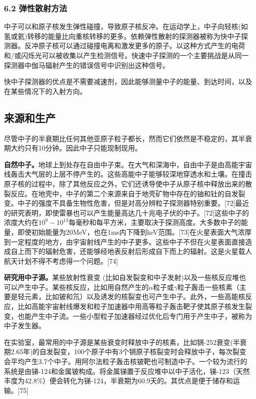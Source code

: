 \subsubsection{6.2 弹性散射方法}
中子可以和原子核发生弹性碰撞，导致原子核反冲。在运动学上，中子向轻核(如氢或氦)转移的能量比向重核转移的更多。依赖弹性散射的探测器被称为快中子探测器。反冲原子核可以通过碰撞电离和激发更多的原子。以这种方式产生的电荷和/或闪烁光可以被收集以产生检测信号。快速中子探测的一个主要挑战是从同一探测器中伽马辐射产生的错误信号中识别出这种信号。

快中子探测器的优点是不需要减速剂，因此能够测量中子的能量、到达时间，以及在某些情况下的入射方向。

\subsection{来源和生产}
尽管中子的半衰期比任何其他亚原子粒子都长，然而它们依然是不稳定的，其半衰期大约只有10分钟。因此中子只能现制现用。

\textbf{自然中子。}地球上到处存在自由中子束。在大气和深海中，自由中子是由高能宇宙线轰击大气层的上层不停产生的。这些高能中子能够较深地穿透水和土壤。在撞击原子核的过程中，除了其他反应之外，它们还诱导使中子从原子核中释放出来的散裂反应。在地壳中，中子的第二个来源来自于地壳矿物中存在的铀和钍的自发裂变。中子的强度不具备生物性危害，但是对高分辨粒子探测器特别重要。[72]最近的研究表明，即使雷暴也可以产生能量高达几十兆电子伏的中子。[72]这些中子的浓度大约在$10^{9}-10^{13}$每毫秒和每平方米，主要取决于探测高度。大多数中子的能量，即使初始能量为20MeV，也在1ms内下降到keV范围。[73]在火星表面大气浓厚到一定程度的地方，由宇宙射线产生的中子更多。这些中子不但在火星表面直接造成自上而下的辐射危害，还能够经地表反射后形成自下而上的辐射。这是火星载人航天计划不得不考虑得一个问题。[74]

\textbf{研究用中子源。}某些放射性衰变 (比如自发裂变和中子发射)以及一些核反应堆也可以产生中子。某些核反应，比如用自然产生的$\alpha$粒子或$\gamma$粒子轰击一些核素（主要是轻元素，比如铍和氘）以及诱发的核裂变也可产生中子。此外，一些高能核反应，比如高能宇宙射线爆发和粒子加速器中用高等粒子轰击靶子使其原子核发生裂变，也能产生中子流。一些小型粒子加速器经过优化后专门用于产生中子，被称为中子发生器。

在实验室，最常用的中子源是某些衰变时释放中子的核素，比如锎-252衰变(半衰期2.65年)的自发裂变，100个原子中有3个锎原子核裂变时会释放中子，每次裂变会平均产生3.7个中子。用阿尔法粒子轰击核铍靶也可制造中子。一个较为流行的系统是由锑-124和金属铍构成。将金属锑置于反应堆中以中子活化，锑-123（天然丰度为42.8\%）便会转化为锑-124，半衰期为60.9天的。其优点是便于储存和运输。[75]

